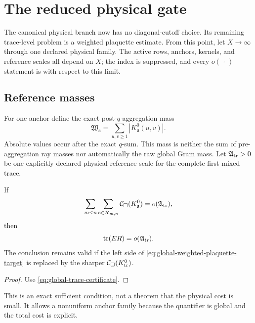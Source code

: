 \section{The reduced physical gate}
\label{sec:physical-ledger}

The canonical physical branch now has no diagonal-cutoff choice.  Its
remaining trace-level problem is a weighted plaquette estimate.
From this point, let \(X\to\infty\) through one declared physical family.
The active rows, anchors, kernels, and reference scales all depend on
\(X\); the index is suppressed, and every \(o(\,\cdot\,)\) statement is
with respect to this limit.

\subsection{Reference masses}

For one anchor define the exact post-\(q\)-aggregation mass
\begin{equation}
 \mathfrak W_{\mathfrak a}
 =
 \sum_{u,v\ge1}|K_{\mathfrak a}^{0}(u,v)|.
 \label{eq:anchored-physical-mass}
\end{equation}
Absolute values occur after the exact \(q\)-sum.  This mass is neither the
sum of pre-aggregation ray masses nor automatically the raw global Gram
mass.  Let \(\mathfrak A_{\rm tr}>0\) be one explicitly declared physical
reference scale for the complete first mixed trace.

\begin{proposition}
\label{prop:canonical-physical-criterion}
If
\begin{equation}
 \sum_{m<n}\sum_{\mathfrak a\in\mathcal R_{m,n}}
 \mathcal C_\square(K_{\mathfrak a}^{0})
 =
 o(\mathfrak A_{\rm tr}),
 \label{eq:global-weighted-plaquette-target}
\end{equation}
then
\begin{equation}
 \operatorname{tr}(ER)=o(\mathfrak A_{\rm tr}).
 \label{eq:trace-saving}
\end{equation}
The conclusion remains valid if the left side of
\eqref{eq:global-weighted-plaquette-target} is replaced by the sharper
\(\mathcal C_\square(K_{\rm tr}^{0})\).
\end{proposition}

\begin{proof}
Use \eqref{eq:global-trace-certificate}.
\end{proof}

This is an exact sufficient condition, not a theorem that the physical
cost is small.  It allows a nonuniform anchor family because the
quantifier is global and the total cost is explicit.

